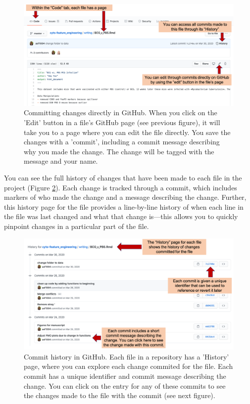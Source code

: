 \documentclass[]{tufte-book}
\begin{document}
\begin{figure}
\includegraphics[width=\textwidth]{figures/github_commits1} \caption[Committing changes directly in GitHub]{Committing changes directly in GitHub. When you click on the 'Edit' button in a file's GitHub page (see previous figure), it will take you to a page where you can edit the file directly. You save the changes with a 'commit', including a commit message describing why you made the change. The change will be tagged with the message and your name.}\label{fig:githubcommits2}
\end{figure}

You can see the full history of changes that have been made to each file in the
project (Figure \ref{fig:githubcommithistory}). Each change is tracked through
a commit, which includes markers of who made the change and a message describing
the change. Further, this history page for the file provides a line-by-line
history of when each line in the file was last changed and what that change
is---this allows you to quickly pinpoint changes in a particular part of the
file.

\begin{figure}
\includegraphics[width=\textwidth]{figures/github_commit_history} \caption[Commit history in GitHub]{Commit history in GitHub. Each file in a repository has a 'History' page, where you can explore each change commited for the file. Each commit has a unique identifier and commit message describing the change. You can click on the entry for any of these commits to see the changes made to the file with the commit (see next figure).}\label{fig:githubcommithistory}
\end{figure}
\end{document}
